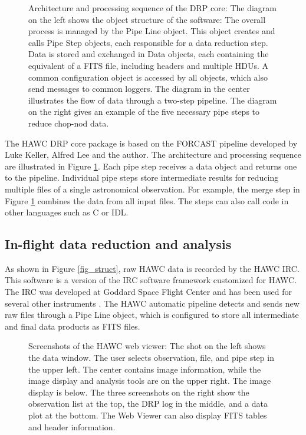 \begin{figure}[!ht]
\caption{Architecture and processing sequence of the DRP core: The
  diagram on the left shows the object structure of the software: The
  overall process is managed by the Pipe Line object. This object
  creates and calls Pipe Step objects, each responsible for a data
  reduction step. Data is stored and exchanged in Data objects, each
  containing the equivalent of a FITS file, including headers and
  multiple HDUs. A common configuration object is accessed by all
  objects, which also send messages to common loggers. The diagram in
  the center illustrates the flow of data through a two-step
  pipeline. The diagram on the right gives an example of the five
  necessary pipe steps to reduce chop-nod data.}

\label{fig_core}
\end{figure}

The HAWC DRP core package is
based on the FORCAST pipeline developed by Luke Keller, Alfred Lee
and the author.
The architecture and processing sequence are
illustrated in Figure \ref{fig_core}. Each pipe step receives a data
object and returns one to the pipeline. Individual pipe steps store
intermediate results for reducing multiple files of a single
astronomical observation. For example, the merge step in Figure
\ref{fig_core} combines the data from all input files. The steps can
also call code in other languages such as C or IDL.

\subsection{In-flight data reduction and analysis}

As shown in Figure \ref{fig_struct}, raw HAWC data is recorded by the
HAWC IRC. This software is a version of the IRC software framework
customized for HAWC. The IRC was developed at Goddard Space Flight
Center and has been used for several other instruments
\citep[see][]{staguhn06}. The HAWC automatic pipeline detects and
sends new raw files through a Pipe Line object, which is configured
to store all intermediate and final data products as FITS files.

\begin{figure}[!ht]

\caption{Screenshots of the HAWC web viewer: The shot on the left
  shows the data window. The user selects observation, file, and pipe
  step in the upper left. The center contains image information, while
  the image display and analysis tools are on the upper right. The
  image display is below. The three screenshots on the right show the
  observation list at the top, the DRP log in the middle, and a data
  plot at the bottom. The Web Viewer can also display FITS tables and
  header information.}

\label{fig_screen}

\end{figure}

